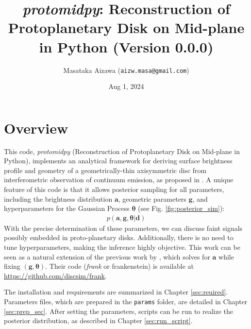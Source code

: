 \documentclass{report}
\title{{\it protomidpy}: Reconstruction of Protoplanetary Disk on Mid-plane in Python  (Version 0.0.0)}
\author{Masataka Aizawa (\texttt{aizw.masa@gmail.com})}
\date{Aug 1, 2024}
\begin{document}
\maketitle

\tableofcontents

\chapter{Overview}
This code, {\it protomidpy} (Reconstruction of Protoplanetary Disk on Mid-plane in Python), implements an analytical framework for deriving surface brightness profile and geometry of a geometrically-thin axisymmetric disc from interferometric observation of continuum emission, as proposed in \cite{aizawa2024}. A unique feature of this code is that it allows posterior sampling for all parameters, including the brightness distribution $\bm{a}$, geometric parameters $\bm{g}$, and hyperparameters for the Gaussian Process $\bm{\theta}$ (see Fig. \ref{fig:posterior_sim}):
\begin{eqnarray}
p(\bm{a}, \bm{g} , \bm{\theta} |\bm{d})
\end{eqnarray}
With the precise determination of these parameters, we can discuss faint signals possibly embedded in proto-planetary disks. Additionally, there is no need to tune hyperparameters, making the inference highly objective. This work can be seen as a natural extension of the previous work by \cite{jennings2020}, which solves for $\bm{a}$ while fixing $(\bm{g} , \bm{\theta})$. Their code (\textit{frank} or frankenstein) is available at \url{https://github.com/discsim/frank}.

The installation and requirements are summarized in Chapter \ref{sec:reuired}. Parameters files, which are prepared in the \texttt{params} folder, are detailed in Chapter \ref{sec:prep_sec}. After setting the parameters, scripts can be run to realize the posterior distribution, as described in Chapter \ref{sec:run_script}.
\end{document}
